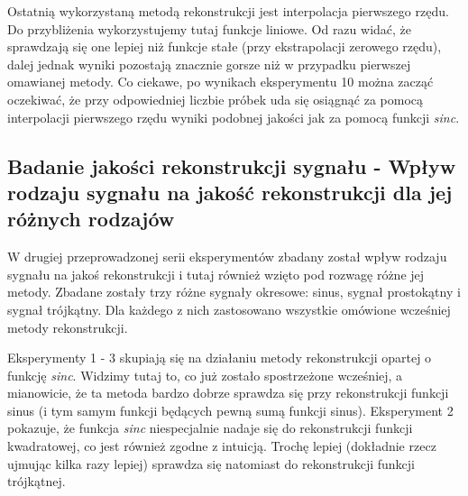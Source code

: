 \documentclass[12pt]{article}
\begin{document}
{{            Ostatnią wykorzystaną metodą rekonstrukcji jest interpolacja pierwszego rzędu. Do przybliżenia
            wykorzystujemy tutaj funkcje liniowe. Od razu widać, że sprawdzają się one lepiej niż funkcje stałe
            (przy ekstrapolacji zerowego rzędu), dalej jednak wyniki pozostają znacznie gorsze niż w przypadku
            pierwszej omawianej metody. Co ciekawe, po wynikach eksperymentu 10 można zacząć oczekiwać, że przy
            odpowiedniej liczbie próbek uda się osiągnąć za pomocą interpolacji pierwszego rzędu wyniki podobnej
            jakości jak za pomocą funkcji \emph{sinc}.

    }


        \subsection{Badanie jakości rekonstrukcji sygnału - Wpływ rodzaju sygnału na jakość
        rekonstrukcji dla jej różnych rodzajów} {

        W drugiej przeprowadzonej serii eksperymentów zbadany został wpływ rodzaju sygnału na jakoś
        rekonstrukcji i tutaj również wzięto pod rozwagę różne jej metody. Zbadane zostały trzy różne
        sygnały okresowe: sinus, sygnał prostokątny i sygnał trójkątny. Dla każdego z nich zastosowano
        wszystkie omówione wcześniej metody rekonstrukcji.

        Eksperymenty 1 - 3 skupiają się na działaniu metody rekonstrukcji opartej o funkcję \emph{sinc}.
        Widzimy tutaj to, co już zostało spostrzeżone wcześniej, a mianowicie, że ta metoda bardzo dobrze
        sprawdza się przy rekonstrukcji funkcji sinus (i tym samym funkcji będących pewną sumą funkcji
        sinus). Eksperyment 2 pokazuje, że funkcja \emph{sinc} niespecjalnie nadaje się do rekonstrukcji
        funkcji kwadratowej, co jest również zgodne z intuicją. Trochę lepiej (dokładnie rzecz ujmując kilka
        razy lepiej) sprawdza się natomiast do rekonstrukcji funkcji trójkątnej.

}}
\end{document}
